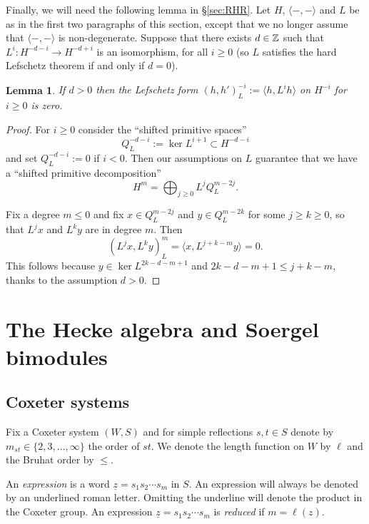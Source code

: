 \documentclass[11pt]{amsart}
\numberwithin{equation}{section}
\def\un{\underline}
\def\to{\rightarrow}
\newtheorem{lem}[thm]{Lemma}
\theoremstyle{definition}
\theoremstyle{remark}
\begin{document}
Finally, we will need the following lemma in
\S\ref{sec:RHR}. Let $H$, $\langle -, - \rangle$ and $L$ be as in the
first two paragraphs of this section, except that we no longer assume
that $\langle -, - \rangle$ is non-degenerate. Suppose that there
exists $d \in {\mathbb{Z}}$ such that $L^i : H^{-d-i} \to H^{-d+i}$ is an
isomorphism, for all $i \ge 0$ (so $L$ satisfies the hard Lefschetz theorem
if and only if $d = 0$).

\begin{lem}\label{lem:shiftedvanishing}
If $d > 0$ then the Lefschetz form $(h, h')_L^{-i} :=
  \langle h, L^i h \rangle$ on $H^{-i}$ for $i \ge 0$
is zero. \end{lem}

\begin{proof} For $i \ge 0$ consider the ``shifted primitive spaces'' 
\[
Q_L^{-d-i} := \ker L^{i+1} \subset H^{-d-i}
\]
and set $Q_L^{-d-i} := 0$ if $i < 0$. Then our assumptions on $L$
guarantee that we have a ``shifted primitive decomposition''
\[
H^m = \bigoplus_{j \ge 0} L^j Q_L^{m-2j}.
\]

Fix a degree $m \le 0$ and fix $x \in Q_L^{m-2j}$ and $y \in Q_L^{m-2k}$ for some $j \ge k \ge 0$, so that $L^j x$ and $L^k y$ are in degree $m$. Then
\[
(L^jx, L^ky)_L^{m} = \langle x, L^{j+k-m}y \rangle = 0.
\]
This follows because $y \in \ker L^{2k-d-m+1}$ and $2k-d-m+1 \le j+k-m$, thanks to the assumption $d > 0$.
\end{proof}



\section{The Hecke algebra and Soergel bimodules} \label{sec:background}

\subsection{Coxeter systems} \label{sec:cox}

Fix a Coxeter system $(W,S)$ and for simple reflections $s, t \in S$
denote by $m_{st} \in \{ 2, 3, \dots, \infty \}$ the order of $st$. We
denote the length function on $W$ by $\ell$ and the Bruhat order by
$\le$.

An \emph{expression} is a word $\un{z} =
s_1s_2\cdots s_m$ in $S$. An expression will always be denoted by an underlined roman letter. Omitting the underline will denote the product in the Coxeter group. An expression $\un{z} =
s_1s_2 \cdots s_m$ is \emph{reduced} if $m = \ell(z)$.
\end{document}
